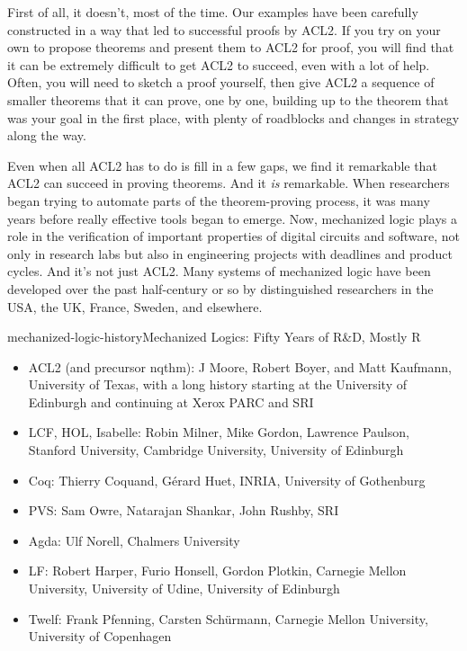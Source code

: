 First of all, it doesn't, most of the time.
Our examples have been carefully constructed in a way that
led to successful proofs by ACL2.
If you try on your own to propose theorems
and present them to ACL2 for proof, you will find that it can be
extremely difficult to get ACL2 to succeed, even with a lot of help.
Often, you will need to sketch a proof yourself,
then give ACL2 a sequence of smaller theorems
that it can prove, one by one, building up to
the theorem that was your goal in the first place,
with plenty of roadblocks and changes in strategy along the way.

Even when all ACL2 has to do is fill in a few gaps,
we find it remarkable that ACL2 can succeed in proving theorems.
And it \emph{is} remarkable.
When researchers began trying to automate parts
of the theorem-proving process, it was many years
before really effective tools began to emerge.
Now, mechanized logic plays a role in
the verification of important properties of digital circuits and
software, not only in research labs
but also in engineering projects with deadlines and product cycles.
And it's not just ACL2. Many systems of mechanized logic %
have been developed over the past half-century or so
by distinguished researchers in the USA, the UK, France, Sweden, and elsewhere.

\begin{aside}{mechanized-logic-history}{Mechanized Logics: Fifty Years of R\&D, Mostly R}
\begin{itemize}
\item ACL2 (and precursor nqthm): J Moore, Robert Boyer, and Matt Kaufmann, University of Texas, with a long history starting at the University of Edinburgh and continuing at Xerox PARC and SRI
\item LCF, HOL, Isabelle: Robin Milner, Mike Gordon, Lawrence Paulson, Stanford University, Cambridge University, University of Edinburgh
\item Coq: Thierry Coquand, G\'erard Huet, INRIA, University of Gothenburg
\item PVS: Sam Owre, Natarajan Shankar, John Rushby, SRI
\item Agda: Ulf Norell, Chalmers University
\item LF: Robert Harper, Furio Honsell, Gordon Plotkin, Carnegie Mellon University, University of Udine, University of Edinburgh
\item Twelf: Frank Pfenning, Carsten Sch\"urmann, Carnegie Mellon University, University of Copenhagen
\end{itemize}
\end{aside}


